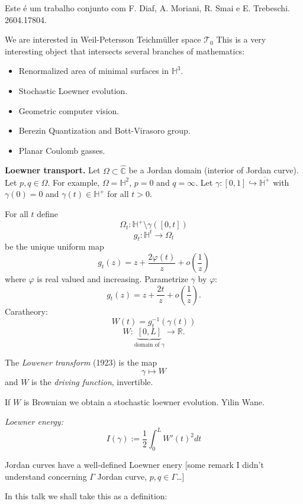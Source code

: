Este é um trabalho conjunto com F. Diaf,
A. Moriani, R. Smai e E. Trebeschi.
2604.17804.

\medskip\noindent
We are interested in Weil-Petersson
Teichmüller space $\mathcal{T}_0$
This is a very interesting object
that intersects several branches of 
mathematics:
\begin{itemize}
\item Renormalized area of minimal surfaces
in $\mathbb{H}^3$.
\item Stochastic Loewner evolution.
\item Geometric computer vision.
\item Berezin Quantization and Bott-Virasoro
group.
\item Planar Coulomb gasses.
\end{itemize}

\medskip\noindent
{\bf Loewner transport.}
Let  $\Omega \subset \hat{\mathbb{C}}$
be a Jordan domain (interior of Jordan
curve).
Let $p,q \in \Omega$.
For example, $\Omega=\mathbb{H}^2$,
$p=0$ and $q=\infty$.
Let $\gamma:[0,1]\hookrightarrow
\overline{\mathbb{H}^+}$
with $\gamma(0)=0$ and $\gamma(t) \in
\mathbb{H}^+$ for all $t>0$.

For all $t$ define
$$
\Omega_t:\mathbb{H}^+\setminus
\gamma([0,t])
$$
$$
g_t:\mathbb{H}^t \to \Omega_t
$$
be the unique uniform map
$$
g_t(z)
=z + \frac{2\varphi(t)}{z}
+ o \left(\frac{1}{z}\right)
$$
where $\varphi$ is real valued and
increasing. Parametrize $\gamma$
by $\varphi$:
$$
g_t(z)=z+ \frac{2t}{z}
+o \left(\frac{1}{z}\right).
$$
Caratheory:
$$
W(t)=g^{-1}_t(\gamma(t))
$$
$$
W:\underbrace{[0,L]}_{\text{domain of }
\gamma} \to \mathbb{R}.
$$

The {\it Lowener transform} (1923)
is the map
$$
\gamma \mapsto W
$$
and $W$ is the {\it driving function},
invertible.

\begin{remark}
\label{remark-brownian-loewner}
If $W$ is Brownian we obtain a 
stochastic loewner evolution.
Yilin Wane.
\end{remark}

\medskip\noindent
{\it Loewner energy:}
$$
I(\gamma)
:= \frac{1}{2}
\int_0^L W'(t)^2 dt
$$
\begin{remark}
\label{remark-loewner-energy-independent}
Jordan curves have a well-defined
Loewner enery
[some remark I didn't understand concerning
$\Gamma$ Jordan curve, $p,q \in \Gamma$…]
\end{remark}

\noindent
In this talk we shall take this
as a definition:

